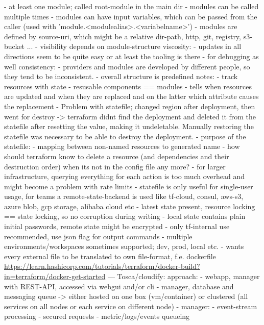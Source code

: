       - at least one module; called root-module in the main dir
      - modules can be called multiple times
      - modules can have input variables, which can be passed from the caller (used with 'module.<modulealias>.<variabelname>')
      - modules are defined by source-uri, which might be a relative dir-path, http, git, registry, s3-bucket ...
    - visibility depends on module-structure
  viscosity:
    - updates in all directions seem to be quite easy or at least the tooling is there - for debugging as well
  consistency:
    - providers and modules are developed by different people, so they tend to be inconsistent.
    - overall structure is predefined
  notes:
    - track resources with state
    - resusable components == modules
    - tells when resources are updated and when they are replaced and on the latter which attribute causes the replacement
    - Problem with statefile; changed region after deployment, then went for destroy -> terraform didnt find the deployment and deleted it from the statefile after resetting the value, making it undeletable. Manually restoring the statefile was necessary to be able to destroy the deployment.
    - purpose of the statefile:
      - mapping between non-named resources to generated name
      - how should terraform know to delete a resource (and dependencies and their destruction order) when its not in the config file any more?
      - for larger infrastructure, querying everything for each action is too much overhead and might become a problem with rate limits
      - statefile is only useful for single-user usage, for teams a remote-state-backend is used like tf-cloud, consul, aws-s3, azure blob, gcp storage, alibaba cloud etc
        - latest state present, resource locking == state locking, so no corruption during writing
      - local state contains plain initial passwords, remote state might be encrypted
      - only tf-internal use recommended, use json flag for output commands
    - multiple environments/workspaces sometimes supported; dev, prod, local etc.
    - wants every external file to be translated to own file-format, f.e. dockerfile \url{https://learn.hashicorp.com/tutorials/terraform/docker-build?in=terraform/docker-get-started}
---
Tosca/cloudify:
  approach:
    - webapp, manager with REST-API, accessed via webgui and/or cli
    - manager, database and messaging queue -> either hosted on one box (vm/container) or clustered (all services on all nodes or each service on different node)
      - manager:
        - event-stream processing
        - secured requests
        - metric/logs/events queueing
